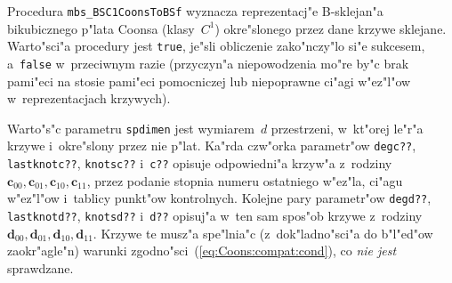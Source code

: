\vspace{\bigskipamount}
Procedura \texttt{mbs\_BSC1CoonsToBSf} wyznacza reprezentacj"e B-sklejan"a
bikubicznego p"lata Coonsa (klasy~$C^1$) okre"slonego przez dane krzywe
sklejane. Warto"sci"a procedury jest \texttt{true}, je"sli obliczenie
zako"nczy"lo si"e sukcesem, a~\texttt{false} w~przeciwnym razie (przyczyn"a
niepowodzenia mo"re by"c brak pami"eci na stosie pami"eci pomocniczej
lub niepoprawne ci"agi w"ez"l"ow w~reprezentacjach krzywych).

Warto"s"c parametru \texttt{spdimen} jest wymiarem~$d$ przestrzeni, w~kt"orej
le"r"a krzywe i~okre"slony przez nie p"lat. Ka"rda czw"orka parametr"ow
\texttt{degc??}, \texttt{lastknotc??}, \texttt{knotsc??} i~\texttt{c??}
opisuje odpowiedni"a krzyw"a z~rodziny
$\bm{c}_{00},\bm{c}_{01},\bm{c}_{10},\bm{c}_{11}$, przez podanie stopnia
numeru ostatniego w"ez"la, ci"agu w"ez"l"ow i~tablicy punkt"ow kontrolnych.
Kolejne pary parametr"ow \texttt{degd??}, \texttt{lastknotd??},
\texttt{knotsd??} i~\texttt{d??} opisuj"a w~ten sam spos"ob krzywe z~rodziny
$\bm{d}_{00},\bm{d}_{01},\bm{d}_{10},\bm{d}_{11}$. Krzywe te musz"a
spe"lnia"c (z~dok"ladno"sci"a do b"l"ed"ow zaokr"agle"n) warunki
zgodno"sci~(\ref{eq:Coons:compat:cond}), co \emph{nie jest} sprawdzane.

